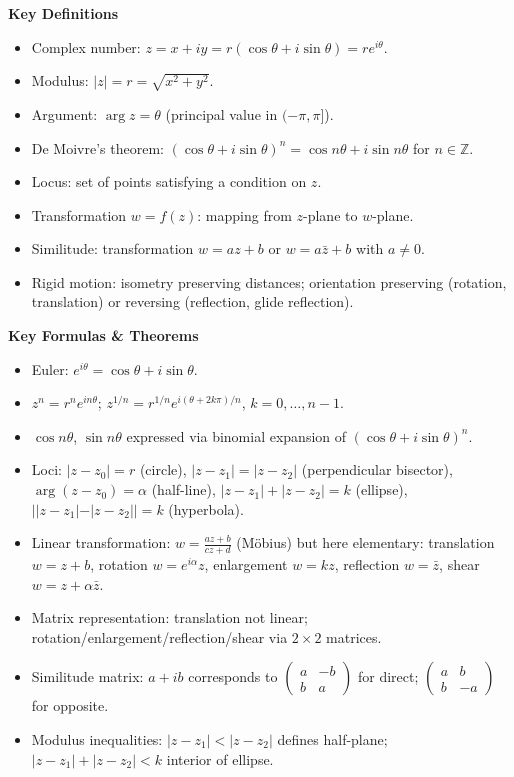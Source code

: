 \documentclass[11pt]{article}
\newcommand{\cle}[1]{{\popxbold\color{popdark}#1}}
\begin{document}
\begin{bilan}
\textbf{Key Definitions}
\begin{itemize}
\item \cle{Complex number}: $z = x+iy = r(\cos\theta + i\sin\theta) = re^{i\theta}$.
\item \cle{Modulus}: $|z| = r = \sqrt{x^2+y^2}$.
\item \cle{Argument}: $\arg z = \theta$ (principal value in $(-\pi,\pi]$).
\item \cle{De Moivre's theorem}: $(\cos\theta + i\sin\theta)^n = \cos n\theta + i\sin n\theta$ for $n\in\mathbb{Z}$.
\item \cle{Locus}: set of points satisfying a condition on $z$.
\item \cle{Transformation $w=f(z)$}: mapping from $z$-plane to $w$-plane.
\item \cle{Similitude}: transformation $w = az + b$ or $w = a\bar{z}+b$ with $a\neq0$.
\item \cle{Rigid motion}: isometry preserving distances; orientation preserving (rotation, translation) or reversing (reflection, glide reflection).
\end{itemize}

\textbf{Key Formulas \& Theorems}
\begin{itemize}
\item Euler: $e^{i\theta}=\cos\theta+i\sin\theta$.
\item $z^n = r^n e^{in\theta}$; $z^{1/n} = r^{1/n} e^{i(\theta+2k\pi)/n}$, $k=0,\dots,n-1$.
\item $\cos n\theta$, $\sin n\theta$ expressed via binomial expansion of $(\cos\theta+i\sin\theta)^n$.
\item Loci: $|z-z_0|=r$ (circle), $|z-z_1|=|z-z_2|$ (perpendicular bisector), $\arg(z-z_0)=\alpha$ (half-line), $|z-z_1|+|z-z_2|=k$ (ellipse), $||z-z_1|-|z-z_2||=k$ (hyperbola).
\item Linear transformation: $w = \frac{az+b}{cz+d}$ (Möbius) but here elementary: translation $w=z+b$, rotation $w=e^{i\alpha}z$, enlargement $w=kz$, reflection $w=\bar{z}$, shear $w=z+\alpha\bar{z}$.
\item Matrix representation: translation not linear; rotation/enlargement/reflection/shear via $2\times2$ matrices.
\item Similitude matrix: $a+ib$ corresponds to $\begin{pmatrix}a&-b\\b&a\end{pmatrix}$ for direct; $\begin{pmatrix}a&b\\b&-a\end{pmatrix}$ for opposite.
\item Modulus inequalities: $|z-z_1|<|z-z_2|$ defines half-plane; $|z-z_1|+|z-z_2|<k$ interior of ellipse.
\end{itemize}


\end{bilan}
\end{document}
